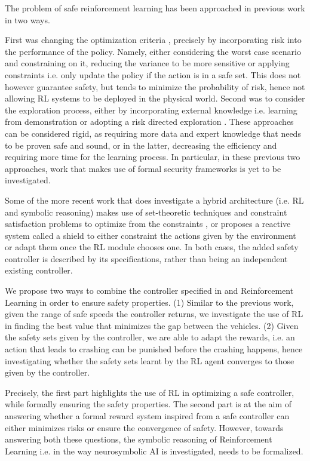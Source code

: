 \documentclass[a4paper,11pt]{article}
\begin{document}
\medskip


The problem of safe reinforcement learning has been approached in previous work \cite{Garca2015ACS} in two ways. 

First was changing the optimization criteria \cite{rockafellar2000}, precisely by incorporating risk into the performance of the policy.
Namely, either considering the worst case scenario and constraining on it, reducing the variance to be more sensitive or applying constraints i.e. only update the policy if the action is in a safe set. 
This does not however guarantee safety, but tends to minimize the probability of risk, hence not allowing RL systems to be deployed in the physical world. 
Second was to consider the exploration process, either by incorporating external knowledge i.e. learning from demonstration \cite{Siebel2007EvolutionaryRL} or adopting a risk directed exploration \cite{law2005}. These approaches can be considered rigid, 
as requiring more data and expert knowledge that needs to be proven safe and sound, or in the latter, decreasing the efficiency and requiring more time for the learning process. 
In particular, in these previous two approaches, work that makes use of formal security frameworks is yet to be investigated. 

\medskip

Some of the more recent work that does investigate a hybrid architecture (i.e. RL and symbolic reasoning) makes use of
set-theoretic techniques and constraint satisfaction problems to optimize from the constraints \cite{Li2021SafeRL}, or proposes a reactive system called a shield \cite{alshiekh2017} to either constraint the actions given by the environment or adapt them once the RL module chooses one. 
In both cases, the added safety controller is described by its specifications, rather than being an independent existing controller. 

\medskip
We propose two ways to combine the controller specified in \cite{vnc20} and Reinforcement Learning in order to ensure safety properties. 
(1) Similar to the previous work, given the range of safe speeds the controller returns, we investigate the use of  RL in finding the best value that minimizes the gap between the vehicles. 
(2) Given the safety sets given by the controller, we are able to adapt the rewards, i.e. an action that leads to crashing can be punished before the crashing happens, hence investigating whether the safety sets learnt
by the RL agent converges to those given by the controller. 

Precisely, the first part highlights the use of RL in optimizing a safe controller, while formally ensuring the safety properties. The second part is at the aim of answering
whether a formal reward system inspired from a safe controller can either minimizes risks or ensure the convergence of safety. 
However, towards answering both these questions, the symbolic reasoning of Reinforcement Learning i.e. in the way neurosymbolic AI is investigated, needs to be formalized. 




\end{document}
